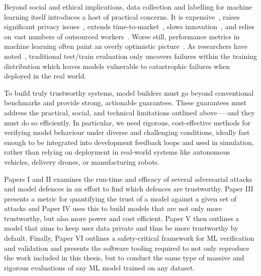 Beyond social and ethical implications, data collection and labelling for machine learning itself introduces a host of practical concerns. 
It is expensive~\cite{roh2019survey}, raises significant privacy issues~\cite{bloom2017self}, extends time-to-market~\cite{lam2004new}, slows innovation~\cite{zirger1996effect}, and relies on vast numbers of outsourced workers~\cite{ai_inequity}.
Worse still, performance metrics in machine learning often paint an overly optimistic picture~\cite{madry2017towards,croce2020reliable}. 
As researchers have noted~\cite{madry2017towards,carlini_towards_2017,croce_reliable_2020,meyers}, traditional test/train evaluation only uncovers failures within the training distribution which leaves models vulnerable to catastrophic failures when deployed in the real world.

To build truly trustworthy systems, model builders must go beyond conventional benchmarks and provide strong, actionable guarantees. 
These guarantees must address the practical, social, and technical limitations outlined above--—and they must do so efficiently. 
In particular, we need rigorous, cost-effective methods for verifying model behaviour under diverse and challenging conditions, ideally fast enough to be integrated into development feedback loops and used in simulation, rather than relying on deployment in real-world systems like autonomous vehicles, delivery drones, or manufacturing robots.

Papers I and II examines the run-time and efficacy of several adversarial attacks and model defences in an effort to find which defences are trustworthy.
Paper III presents a metric for quantifying the trust of a model against a given set of attacks and Paper IV uses this to build models that are not only more trustworthy, but also more power and cost efficient. 
Paper V then outlines a model that aims to keep user data private and thus be more trustworthy by default. 
Finally, Paper VI outlines a safety-critical framework for ML verification and validation and presents the software tooling required to not only reproduce the work included in this thesis, but to conduct the same type of massive and rigorous evaluations of any ML model trained on any dataset.